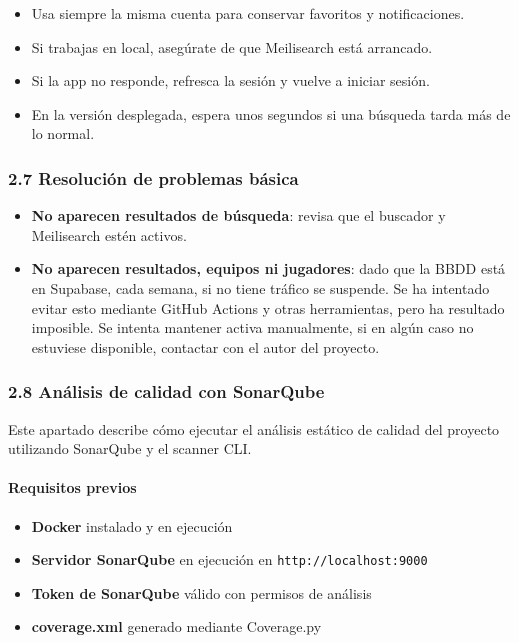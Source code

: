 \begin{itemize}
    \item Usa siempre la misma cuenta para conservar favoritos y notificaciones.
    \item Si trabajas en local, asegúrate de que Meilisearch está arrancado.
    \item Si la app no responde, refresca la sesión y vuelve a iniciar sesión.
    \item En la versión desplegada, espera unos segundos si una búsqueda tarda más de lo normal.
\end{itemize}

\subsubsection*{2.7 Resolución de problemas básica}

\begin{itemize}
    \item \textbf{No aparecen resultados de búsqueda}: revisa que el buscador y Meilisearch estén activos.
    \item \textbf{No aparecen resultados, equipos ni jugadores}: dado que la BBDD está en Supabase, cada semana, si no tiene tráfico se suspende. Se ha intentado evitar esto mediante GitHub Actions y otras herramientas, pero ha resultado imposible. Se intenta mantener activa manualmente, si en algún caso no estuviese disponible, contactar con el autor del proyecto.

\end{itemize}
 

\subsubsection*{2.8 Análisis de calidad con SonarQube}

Este apartado describe cómo ejecutar el análisis estático de calidad del proyecto utilizando SonarQube y el scanner CLI.

\paragraph*{Requisitos previos}

\begin{itemize}
    \item \textbf{Docker} instalado y en ejecución
    \item \textbf{Servidor SonarQube} en ejecución en \texttt{http://localhost:9000}
    \item \textbf{Token de SonarQube} válido con permisos de análisis
    \item \textbf{coverage.xml} generado mediante Coverage.py
\end{itemize}

